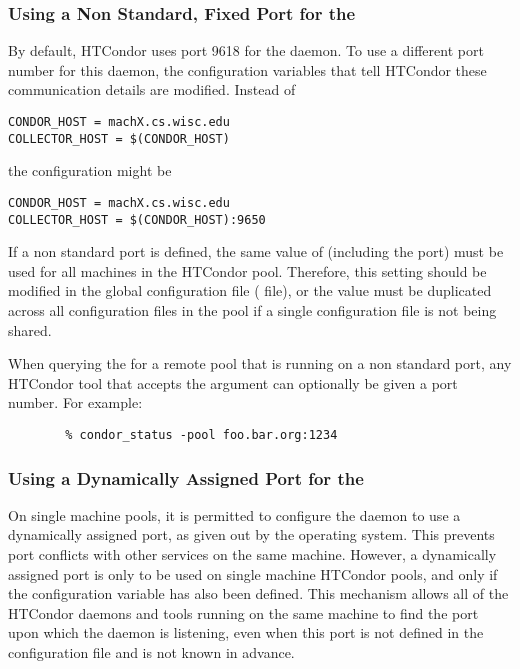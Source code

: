 \subsubsection{\label{sec:Ports-NonStandard}Using 
a Non Standard, Fixed Port for the }
By default,
HTCondor uses port 9618 for the  daemon.
To use a different port number for this daemon,
the configuration variables that tell HTCondor these communication
details are modified.
Instead of
\begin{verbatim}
CONDOR_HOST = machX.cs.wisc.edu
COLLECTOR_HOST = $(CONDOR_HOST)
\end{verbatim}
the configuration might be
\begin{verbatim}
CONDOR_HOST = machX.cs.wisc.edu
COLLECTOR_HOST = $(CONDOR_HOST):9650
\end{verbatim}

If a non standard port is defined, the same value of
 (including the port) must be used for all
machines in the HTCondor pool.
Therefore, this setting should be modified in the global
configuration file ( file),
or the value must be duplicated across
all configuration files in the pool if a single configuration file
is not being shared.

When querying the  for a remote pool that is running
on a non standard port, any HTCondor tool that accepts the 
argument can optionally be given a port number.  For example:
\footnotesize
\begin{verbatim}
        % condor_status -pool foo.bar.org:1234
\end{verbatim}
\normalsize


\subsubsection{\label{sec:Ports-Dynamic-Collector}Using 
a Dynamically Assigned Port for the }

On single machine pools, 
it is permitted to configure the
 daemon
to use a dynamically assigned port,
as given out by the operating system.
This prevents port conflicts with other services on the same machine.
However, a dynamically assigned port is only to be used on
single machine HTCondor pools,
and only if the
configuration variable has also been defined.
This mechanism allows all of the HTCondor daemons and tools running on
the same machine to find the port upon which the 
daemon is listening,
even when this port is not defined in the
configuration file and is not known in advance.

